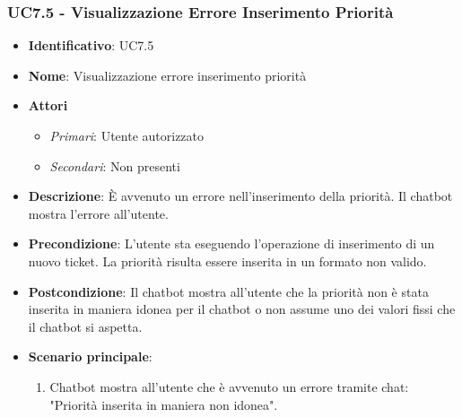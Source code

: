 \subsubsection{UC7.5 - Visualizzazione Errore Inserimento Priorità}
\begin{itemize}
	\item \textbf{Identificativo}: UC7.5
	\item \textbf{Nome}:  Visualizzazione errore inserimento priorità
	\item \textbf{Attori}
	\begin{itemize} 
		\item \textit{Primari}: Utente autorizzato
		\item \textit{Secondari}: Non presenti
	\end{itemize}
	\item \textbf{Descrizione}: È avvenuto un errore nell'inserimento della priorità. Il chatbot mostra l'errore all'utente.
	\item \textbf{Precondizione}: L'utente sta eseguendo l'operazione di inserimento di un nuovo ticket. La priorità risulta essere inserita in un formato non valido. 
	\item \textbf{Postcondizione}: Il chatbot mostra all'utente che la priorità non è stata inserita in maniera idonea per il chatbot o non assume uno dei valori fissi che il chatbot si aspetta.
	\item \textbf{Scenario principale}: \begin{enumerate}
		\item Chatbot mostra all'utente che è avvenuto un errore tramite chat: "Priorità inserita in maniera non idonea".
	\end{enumerate}
\end{itemize}
\newpage